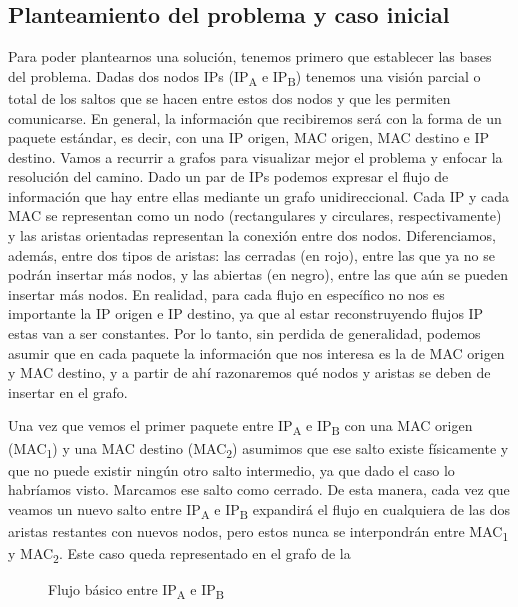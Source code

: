 \documentclass[twoside, 12pt]{epstfg}
\begin{document}
\subsection{Planteamiento del problema y caso inicial}

Para poder plantearnos una solución, tenemos primero que establecer las bases del problema. Dadas dos nodos IPs (IP\textsubscript{A} e IP\textsubscript{B}) tenemos una visión parcial o total de los saltos que se hacen entre estos dos nodos y que les permiten comunicarse. En general, la información que recibiremos será con la forma de un paquete estándar, es decir, con una IP origen, MAC origen, MAC destino e IP destino. Vamos a recurrir a grafos para visualizar mejor el problema y enfocar la resolución del camino. Dado un par de IPs podemos expresar el flujo de información que hay entre ellas mediante un grafo unidireccional. Cada IP y cada MAC se representan como un nodo (rectangulares y circulares, respectivamente) y las aristas orientadas representan la conexión entre dos nodos. Diferenciamos, además, entre dos tipos de aristas: las cerradas (en rojo), entre las que ya no se podrán insertar más nodos, y las abiertas (en negro), entre las que aún se pueden insertar más nodos. En realidad, para cada flujo en específico no nos es importante la IP origen e IP destino, ya que al estar reconstruyendo flujos IP estas van a ser constantes. Por lo tanto, sin perdida de generalidad, podemos asumir que en cada paquete la información que nos interesa es la de MAC origen y MAC destino, y a partir de ahí razonaremos qué nodos y aristas se deben de insertar en el grafo. 

Una vez que vemos el primer paquete entre IP\textsubscript{A} e IP\textsubscript{B} con una MAC origen (MAC\textsubscript{1}) y una MAC destino (MAC\textsubscript{2}) asumimos que ese salto existe físicamente y que no puede existir ningún otro salto intermedio, ya que dado el caso lo habríamos visto. Marcamos ese salto como cerrado. De esta manera, cada vez que veamos un nuevo salto entre IP\textsubscript{A} e IP\textsubscript{B} expandirá el flujo en cualquiera de las dos aristas restantes con nuevos nodos, pero estos nunca se interpondrán entre MAC\textsubscript{1} y MAC\textsubscript{2}. Este caso queda representado en el grafo de la 

\begin{figure}[H]
\centering

\caption[Flujo básico entre dos IPs]{Flujo básico entre IP\textsubscript{A} e IP\textsubscript{B}}
\label{fig:Analisis:BasicFlow}
\end{figure}
\end{document}
